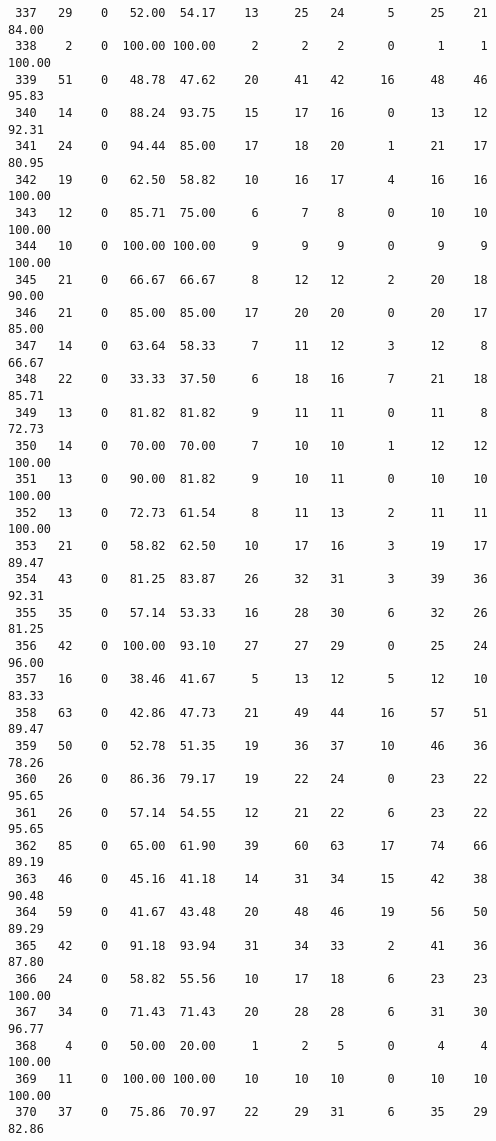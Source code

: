 \begin{verbatim}
 337   29    0   52.00  54.17    13     25   24      5     25    21    84.00
 338    2    0  100.00 100.00     2      2    2      0      1     1   100.00
 339   51    0   48.78  47.62    20     41   42     16     48    46    95.83
 340   14    0   88.24  93.75    15     17   16      0     13    12    92.31
 341   24    0   94.44  85.00    17     18   20      1     21    17    80.95
 342   19    0   62.50  58.82    10     16   17      4     16    16   100.00
 343   12    0   85.71  75.00     6      7    8      0     10    10   100.00
 344   10    0  100.00 100.00     9      9    9      0      9     9   100.00
 345   21    0   66.67  66.67     8     12   12      2     20    18    90.00
 346   21    0   85.00  85.00    17     20   20      0     20    17    85.00
 347   14    0   63.64  58.33     7     11   12      3     12     8    66.67
 348   22    0   33.33  37.50     6     18   16      7     21    18    85.71
 349   13    0   81.82  81.82     9     11   11      0     11     8    72.73
 350   14    0   70.00  70.00     7     10   10      1     12    12   100.00
 351   13    0   90.00  81.82     9     10   11      0     10    10   100.00
 352   13    0   72.73  61.54     8     11   13      2     11    11   100.00
 353   21    0   58.82  62.50    10     17   16      3     19    17    89.47
 354   43    0   81.25  83.87    26     32   31      3     39    36    92.31
 355   35    0   57.14  53.33    16     28   30      6     32    26    81.25
 356   42    0  100.00  93.10    27     27   29      0     25    24    96.00
 357   16    0   38.46  41.67     5     13   12      5     12    10    83.33
 358   63    0   42.86  47.73    21     49   44     16     57    51    89.47
 359   50    0   52.78  51.35    19     36   37     10     46    36    78.26
 360   26    0   86.36  79.17    19     22   24      0     23    22    95.65
 361   26    0   57.14  54.55    12     21   22      6     23    22    95.65
 362   85    0   65.00  61.90    39     60   63     17     74    66    89.19
 363   46    0   45.16  41.18    14     31   34     15     42    38    90.48
 364   59    0   41.67  43.48    20     48   46     19     56    50    89.29
 365   42    0   91.18  93.94    31     34   33      2     41    36    87.80
 366   24    0   58.82  55.56    10     17   18      6     23    23   100.00
 367   34    0   71.43  71.43    20     28   28      6     31    30    96.77
 368    4    0   50.00  20.00     1      2    5      0      4     4   100.00
 369   11    0  100.00 100.00    10     10   10      0     10    10   100.00
 370   37    0   75.86  70.97    22     29   31      6     35    29    82.86

\end{verbatim}

